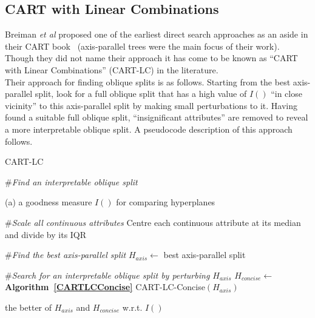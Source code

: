 \subsection{CART with Linear Combinations}
\label{CARTwithLinearCombinations}
Breiman \emph{et al} proposed one of the earliest direct search approaches as an aside in their CART book~\cite{cart84-2} (axis-parallel trees were the main focus of their work). Though they did not name their approach it has come to be known as ``CART with Linear Combinations'' (CART-LC) in the literature. \\

Their approach for finding oblique splits is as follows. Starting from the best axis-parallel split, look for a full oblique split that has a high value of $I()$ ``in close vicinity'' to this axis-parallel split by making small perturbations to it. Having found a suitable full oblique split, ``insignificant attributes'' are removed to reveal a more interpretable oblique split. A pseudocode description of this approach follows. \\

\begin{algorithm}
\caption{CART-LC}
\begin{algorithmic}
\STATE \#\emph{Find an interpretable oblique split}

\medskip
\REQUIRE (a) a goodness measure $I()$ for comparing hyperplanes

\medskip
\STATE \#\emph{Scale all continuous attributes}
\STATE Centre each continuous attribute at its median and divide by its IQR

\medskip
\STATE \#\emph{Find the best axis-parallel split}
\STATE $H_{axis}\leftarrow$ best axis-parallel split

\medskip
\STATE \#\emph{Search for an interpretable oblique split by perturbing $H_{axis}$}
\STATE $H_{concise}\leftarrow$ \textbf{Algorithm~\ref{CARTLCConcise}} CART-LC-Concise$(H_{axis})$

\medskip
\RETURN the better of $H_{axis}$ and $H_{concise}$ w.r.t. $I()$
\end{algorithmic}
\label{CARTLC}
\end{algorithm}

